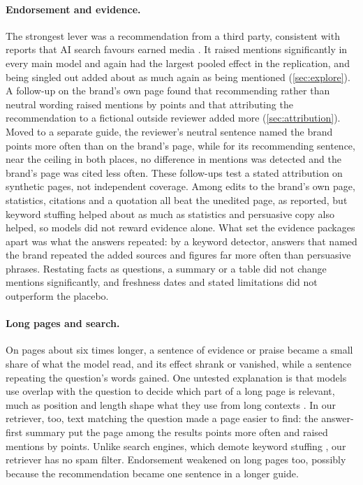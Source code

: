 \paragraph{Endorsement and evidence.} The strongest lever was a recommendation from a third party, consistent with
reports that AI search favours earned media \citep{chen2025dominate}. It raised mentions significantly in every main
model and again had the largest pooled effect in the replication, and being singled out added about as much again as
being mentioned (\cref{sec:explore}). A follow-up on the brand's own page found that recommending rather than neutral
wording raised mentions by \AttrRecU{} points and that attributing the recommendation to a fictional outside reviewer
added \AttrExtU{} more (\cref{sec:attribution}). Moved to a separate guide, the reviewer's neutral sentence named the
brand \SiteNeuU{} points more often than on the brand's page, while for its recommending sentence, near the ceiling in
both places, no difference in mentions was detected and the brand's page was cited less often. These follow-ups test a stated attribution on synthetic pages, not
independent coverage. Among edits to the brand's own page, statistics, citations and a quotation all beat the unedited page, as
\citet{aggarwal2024geo} reported, but keyword stuffing helped about as much as statistics and persuasive copy also
helped, so models did not reward evidence alone. What set the evidence packages apart was what the answers repeated: by
a keyword detector, answers that named the brand repeated the added sources and figures far more often than persuasive
phrases. Restating facts as questions, a summary or a table did not change mentions significantly, and freshness dates
and stated limitations did not outperform the placebo.

\paragraph{Long pages and search.} On pages about six times longer, a sentence of evidence or praise became a small share
of what the model read, and its effect shrank or vanished, while a sentence repeating the question's words gained. One
untested explanation is that models use overlap with the question to decide which part of a long page is relevant, much
as position and length shape what they use from long contexts \citep{liu2024lost}. In our retriever, too, text matching
the question made a page easier to find: the answer-first summary put the page among the results
\AgESurfAnswerFirstU{} points more often and raised mentions by \AgEMenAnswerFirstU{} points. Unlike search engines,
which demote keyword stuffing \citep{google2026spam}, our retriever has no spam filter. Endorsement weakened on long
pages too, possibly because the recommendation became one sentence in a longer guide.

